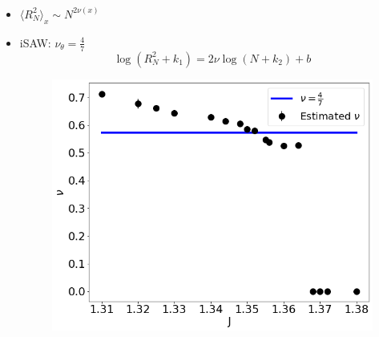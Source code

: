 \documentclass{beamer}
\begin{document}
\begin{frame} 
	\frametitle{\insertsection}
	\framesubtitle{\insertsubsection}
	\begin{minipage}{0.48\linewidth}
		\begin{itemize} 
			
			\item $ \langle R_N^2 \rangle_x \sim N^{2 \nu(x)}  $
			\item iSAW: $\nu_{\theta} = \frac{4}{7}$
	   \begin{equation*}
	 \label{berettiscale}
	 \log (R_N^2+k_1 ) = 2 \nu \log (N+k_2) + b
	 \end{equation*}
	 
	 		\begin{figure}[h]
	 	\centering
	 	\includegraphics[scale=0.1822]{nu_shortchains_1.png} 
	 
	 \end{figure}
		\end{itemize} 
		

\end{minipage}
\end{frame}
\end{document}
